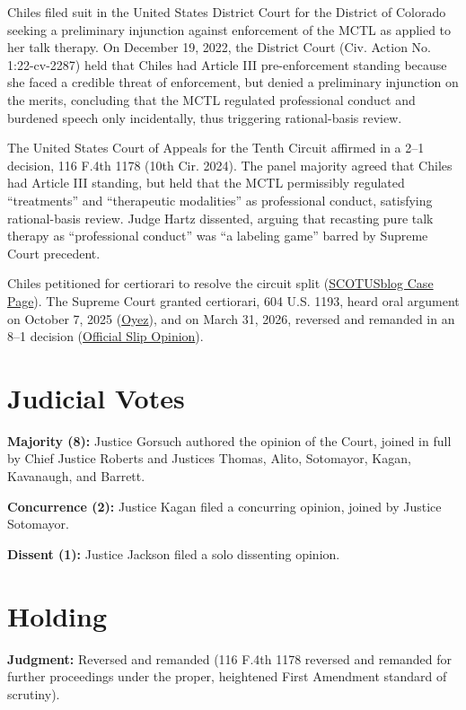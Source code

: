 \documentclass[12pt]{article}
\begin{document}
Chiles filed suit in the United States District Court for the District of Colorado seeking a preliminary injunction against enforcement of the MCTL as applied to her talk therapy. On December 19, 2022, the District Court (Civ. Action No. 1:22-cv-2287) held that Chiles had Article III pre-enforcement standing because she faced a credible threat of enforcement, but denied a preliminary injunction on the merits, concluding that the MCTL regulated professional conduct and burdened speech only incidentally, thus triggering rational-basis review.

The United States Court of Appeals for the Tenth Circuit affirmed in a 2--1 decision, 116 F.4th 1178 (10th Cir. 2024). The panel majority agreed that Chiles had Article III standing, but held that the MCTL permissibly regulated ``treatments'' and ``therapeutic modalities'' as professional conduct, satisfying rational-basis review. Judge Hartz dissented, arguing that recasting pure talk therapy as ``professional conduct'' was ``a labeling game'' barred by Supreme Court precedent.

Chiles petitioned for certiorari to resolve the circuit split (\href{https://www.scotusblog.com/cases/chiles-v-salazar/}{SCOTUSblog Case Page}). The Supreme Court granted certiorari, 604 U.S. 1193, heard oral argument on October 7, 2025 (\href{https://www.oyez.org/cases/2025/24-539}{Oyez}), and on March 31, 2026, reversed and remanded in an 8--1 decision (\href{https://www.supremecourt.gov/opinions/25pdf/24-539_fd9g.pdf}{Official Slip Opinion}).

\section{Judicial Votes}

\textbf{Majority (8):} Justice Gorsuch authored the opinion of the Court, joined in full by Chief Justice Roberts and Justices Thomas, Alito, Sotomayor, Kagan, Kavanaugh, and Barrett.

\textbf{Concurrence (2):} Justice Kagan filed a concurring opinion, joined by Justice Sotomayor.

\textbf{Dissent (1):} Justice Jackson filed a solo dissenting opinion.

\section{Holding}

\textbf{Judgment:} Reversed and remanded (116 F.4th 1178 reversed and remanded for further proceedings under the proper, heightened First Amendment standard of scrutiny).
\end{document}

